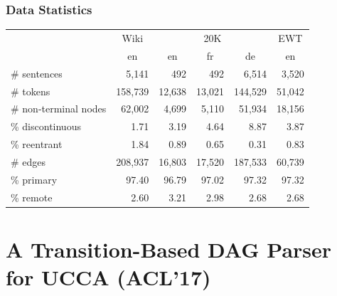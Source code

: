 \documentclass[t,xcolor={svgnames,table}]{beamer}
\begin{document}
\begin{frame}
\frametitle{Data Statistics}
\centering
\def\arraystretch{1.5}
\begin{tabular}{l|r|rrr|r}
    & \multicolumn{1}{c|}{Wiki} & \multicolumn{3}{c|}{20K} & \multicolumn{1}{c}{EWT} \\
    & \multicolumn{1}{c|}{en} & \multicolumn{1}{c}{en} & \multicolumn{1}{c}{fr} & \multicolumn{1}{c|}{de} & \multicolumn{1}{c}{en} \\
    \hline
    \# sentences&5,141&492&492&6,514&3,520 \\
    \# tokens&158,739&12,638&13,021&144,529&51,042 \\
    \hline
    \# {\color{blue} non-terminal nodes}&62,002&4,699&5,110&51,934&18,156 \\
    \% {\color{red}discontinuous}&1.71&3.19&4.64&8.87&3.87 \\
    \% {\color{orange}reentrant}&1.84&0.89&0.65&0.31&0.83 \\
    \hline
    \# edges&208,937&16,803&17,520&187,533&60,739 \\
    \% primary&97.40&96.79&97.02&97.32&97.32 \\
    \% remote&2.60&3.21&2.98&2.68&2.68
\end{tabular}
\end{frame}



\section[Transition-based UCCA Parser]{A Transition-Based DAG Parser for UCCA (ACL'17)}
\end{document}
